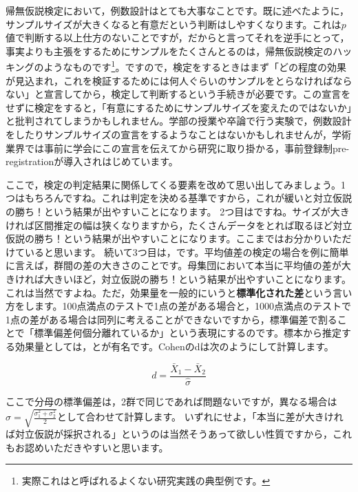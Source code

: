 \documentclass{ltjsbook}
\begin{document}
帰無仮説検定において，例数設計はとても大事なことです。既に述べたように，サンプルサイズが大きくなると有意だという判断はしやすくなります。これは$p$値で判断する以上仕方のないことですが，だからと言ってそれを逆手にとって，事実よりも主張をするためにサンプルをたくさんとるのは，帰無仮説検定のハッキングのようなものです\footnote{実際これはと呼ばれるよくない研究実践の典型例です。}。ですので，検定をするときはまず「どの程度の効果が見込まれ，これを検証するためには何人ぐらいのサンプルをとらなければならない」と宣言してから，検定して判断するという手続きが必要です。この宣言をせずに検定をすると，「有意にするためにサンプルサイズを変えたのではないか」と批判されてしまうかもしれません。学部の授業や卒論で行う実験で，例数設計をしたりサンプルサイズの宣言をするようなことはないかもしれませんが，学術業界では事前に学会にこの宣言を伝えてから研究に取り掛かる，事前登録制pre-registrationが導入されはじめています。

ここで，検定の判定結果に関係してくる要素を改めて思い出してみましょう。1つはもちろんですね。これは判定を決める基準ですから，これが緩いと対立仮説の勝ち！という結果が出やすいことになります。
2つ目はですね。サイズが大きければ区間推定の幅は狭くなりますから，たくさんデータをとれば取るほど対立仮説の勝ち！という結果が出やすいことになります。ここまではお分かりいただけていると思います。
続いて3つ目は，です。平均値差の検定の場合を例に簡単に言えば，群間の差の大きさのことです。母集団において本当に平均値の差が大きければ大きいほど，対立仮説の勝ち！という結果が出やすいことになります。これは当然ですよね。ただ，効果量を一般的にいうと\textbf{標準化された差}という言い方をします。100点満点のテストで1点の差がある場合と，1000点満点のテストで1点の差がある場合は同列に考えることができないですから，標準偏差で割ることで「標準偏差何個分離れているか」という表現にするのです。標本から推定する効果量としては，とが有名です。Cohenのdは次のようにして計算します。

$$d = \frac{\bar{X}_1-\bar{X}_2}{\hat{\sigma}}$$

ここで分母の標準偏差は，2群で同じであれば問題ないですが，異なる場合は$\hat{\sigma} = \sqrt{\frac{\sigma_1^2+\sigma_2^2}{2}}$として合わせて計算します。
いずれにせよ，「本当に差が大きければ対立仮説が採択される」というのは当然そうあって欲しい性質ですから，これもお認めいただきやすいと思います。
\end{document}
